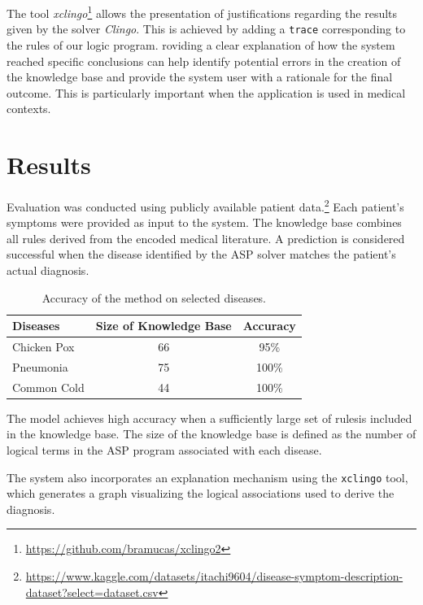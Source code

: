 \documentclass[10pt,leqno]{amsart}
\newcommand{\src}[1]{\texttt{#1}}
\begin{document}
The tool \textit{xclingo}\footnote{\url{https://github.com/bramucas/xclingo2}} \cite{Cabalar_2020} 
allows the presentation of justifications regarding the results given by the solver \textit{Clingo}. 
This is achieved by adding a \src{trace} corresponding to the rules of our logic program. 
roviding a clear explanation of how the system reached specific conclusions can help identify potential 
errors in the creation of the knowledge base and provide the system user with a rationale for the final outcome. 
This is particularly important when the application is used in medical contexts.

\section{Results}

Evaluation was conducted using publicly available patient data.\footnote{\url{https://www.kaggle.com/datasets/itachi9604/disease-symptom-description-dataset?select=dataset.csv}} 
Each patient's symptoms were provided as input to the system. 
The knowledge base combines all rules derived from the encoded medical literature. 
A prediction is considered successful when the disease identified by the ASP solver matches the patient’s actual diagnosis.
\begin{table}[h]
    \centering
    \begin{tabular}{lcc}
    \hline
    Diseases & Size of Knowledge Base & Accuracy \\
    \hline
    \hline
    Chicken Pox      &  66  & 95\% \\
    Pneumonia        &  75  & 100\% \\
    Common Cold    &   44 & 100\% \\
    \hline
    \end{tabular}
    \caption{Accuracy of the method on selected diseases.}
\end{table}

The model achieves high accuracy when a sufficiently 
large set of rulesis included in the knowledge base. 
The size of the knowledge base is defined as the number 
of logical terms in the ASP program associated with each disease.

The system also incorporates an explanation mechanism using the \src{xclingo} tool,
which generates a graph visualizing the logical associations used to derive the diagnosis.
\end{document}
